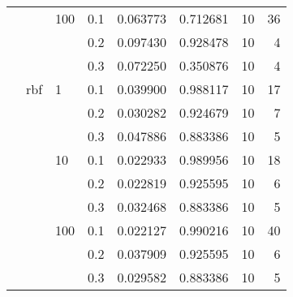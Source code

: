 \begin{table}[H]
\begin{tabular}{llllrrrr}
       &     & 100 & 0.1 &     0.063773 &  0.712681 &        10 &    36 \\
       &     &     & 0.2 &     0.097430 &  0.928478 &        10 &     4 \\
       &     &     & 0.3 &     0.072250 &  0.350876 &        10 &     4 \\
       & rbf & 1   & 0.1 &     0.039900 &  0.988117 &        10 &    17 \\
       &     &     & 0.2 &     0.030282 &  0.924679 &        10 &     7 \\
       &     &     & 0.3 &     0.047886 &  0.883386 &        10 &     5 \\
       &     & 10  & 0.1 &     0.022933 &  0.989956 &        10 &    18 \\
       &     &     & 0.2 &     0.022819 &  0.925595 &        10 &     6 \\
       &     &     & 0.3 &     0.032468 &  0.883386 &        10 &     5 \\
       &     & 100 & 0.1 &     0.022127 &  0.990216 &        10 &    40 \\
       &     &     & 0.2 &     0.037909 &  0.925595 &        10 &     6 \\
       &     &     & 0.3 &     0.029582 &  0.883386 &        10 &     5 \\
\bottomrule
\end{tabular}
\end{table}
